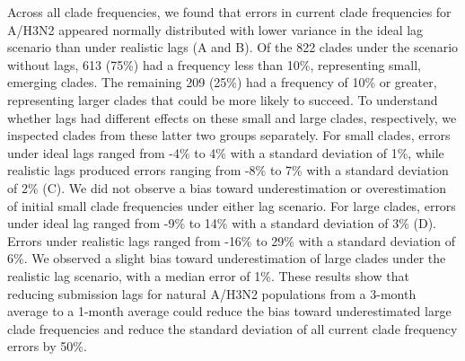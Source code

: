 \documentclass[9pt,lineno]{elife}
\begin{document}
Across all clade frequencies, we found that errors in current clade frequencies for A/H3N2 appeared normally distributed with lower variance in the ideal lag scenario than under realistic lags (A and B).
Of the 822 clades under the scenario without lags, 613 (75\%) had a frequency less than 10\%, representing small, emerging clades.
The remaining 209 (25\%) had a frequency of 10\% or greater, representing larger clades that could be more likely to succeed.
To understand whether lags had different effects on these small and large clades, respectively, we inspected clades from these latter two groups separately.
For small clades, errors under ideal lags ranged from -4\% to 4\% with a standard deviation of 1\%, while realistic lags produced errors ranging from -8\% to 7\% with a standard deviation of 2\% (C).
We did not observe a bias toward underestimation or overestimation of initial small clade frequencies under either lag scenario.
For large clades, errors under ideal lag ranged from -9\% to 14\% with a standard deviation of 3\% (D).
Errors under realistic lags ranged from -16\% to 29\% with a standard deviation of 6\%.
We observed a slight bias toward underestimation of large clades under the realistic lag scenario, with a median error of 1\%.
These results show that reducing submission lags for natural A/H3N2 populations from a 3-month average to a 1-month average could reduce the bias toward underestimated large clade frequencies and reduce the standard deviation of all current clade frequency errors by 50\%.
\end{document}
